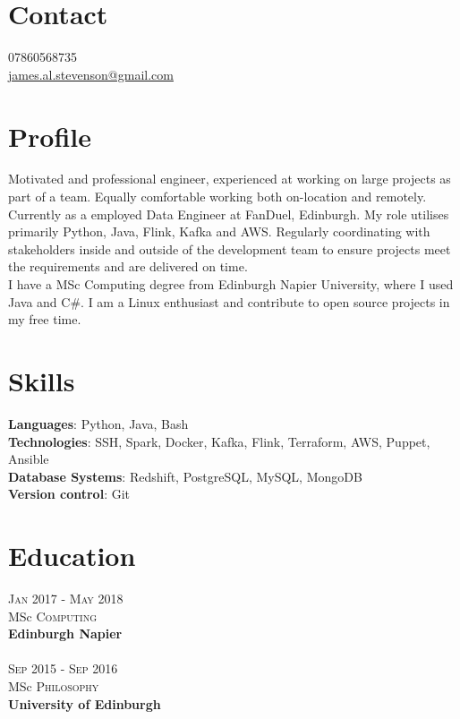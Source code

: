 \documentclass[14pt, a4paper]{extarticle}
\begin{document}
\par{\bigskip\par
\section{Contact}
\large
07860568735\\
\href{mailto:james.al.stevenson@gmail.com}{james.al.stevenson@gmail.com}\\
}

\begin{multicols}{2}

\section{Profile}
\noindent Motivated and professional engineer, experienced at working on large projects as part of a team. Equally comfortable working both on-location and remotely.\\
Currently as a employed Data Engineer at FanDuel, Edinburgh. My role utilises primarily Python, Java, Flink, Kafka and AWS. Regularly coordinating with stakeholders inside and outside of the development team to ensure projects meet the requirements and are delivered on time.\\
I have a MSc Computing degree from Edinburgh Napier University, where I used Java and C\#. I am a Linux enthusiast and contribute to open source projects in my free time.

\section{Skills}
\noindent\textbf{Languages}: Python, Java, Bash\\
\textbf{Technologies}: SSH, Spark, Docker, Kafka, Flink, Terraform, AWS, Puppet, Ansible\\
\textbf{Database Systems}: Redshift, PostgreSQL, MySQL, MongoDB\\
\textbf{Version control}: Git\\

\section{Education}
\noindent\textsc{Jan} 2017 - \textsc{May} 2018\\
MSc \textsc{Computing} \\
\textbf{Edinburgh Napier}\\~\\
\textsc{Sep} 2015 - \textsc{Sep} 2016\\
MSc \textsc{Philosophy} \\
\textbf{University of Edinburgh}


\end{multicols}
\end{document}
